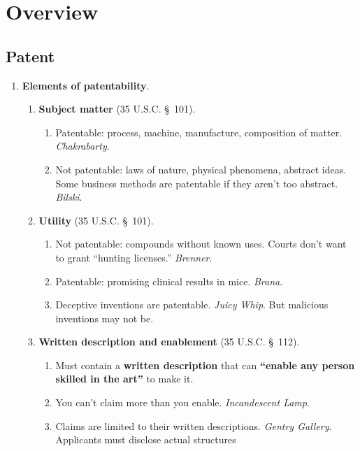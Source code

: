 \section{Overview}

\subsection{Patent}

\begin{enumerate}
    \item \textbf{Elements of patentability}.
    \begin{enumerate}
        \item \textbf{Subject matter} (35 U.S.C. \S\ 101).
        \begin{enumerate}
            \item Patentable: process, machine, manufacture, composition of 
            matter. \emph{Chakrabarty}.
            \item Not patentable: laws of nature, physical phenomena, abstract 
            ideas. Some business methods are patentable if they aren't too 
            abstract. \emph{Bilski}.
        \end{enumerate}
        \item \textbf{Utility} (35 U.S.C. \S\ 101).
        \begin{enumerate}
            \item Not patentable: compounds without known uses.  Courts don't 
            want to grant ``hunting licenses.'' \emph{Brenner}.  \item 
            Patentable: promising clinical results in mice.  \emph{Brana}.
            \item Deceptive inventions are patentable. \emph{Juicy Whip}. But 
            malicious inventions may not be.
        \end{enumerate}
        \item \textbf{Written description and enablement} (35 U.S.C. \S\ 112).
        \begin{enumerate}
            \item Must contain a \textbf{written description} that can 
            \textbf{``enable any person skilled in the art''} to make it.
            \item You can't claim more than you enable. \emph{Incandescent 
            Lamp}.
            \item Claims are limited to their written descriptions.  
            \emph{Gentry Gallery}. Applicants must disclose actual structures 

\end{enumerate}
\end{enumerate}
\end{enumerate}
